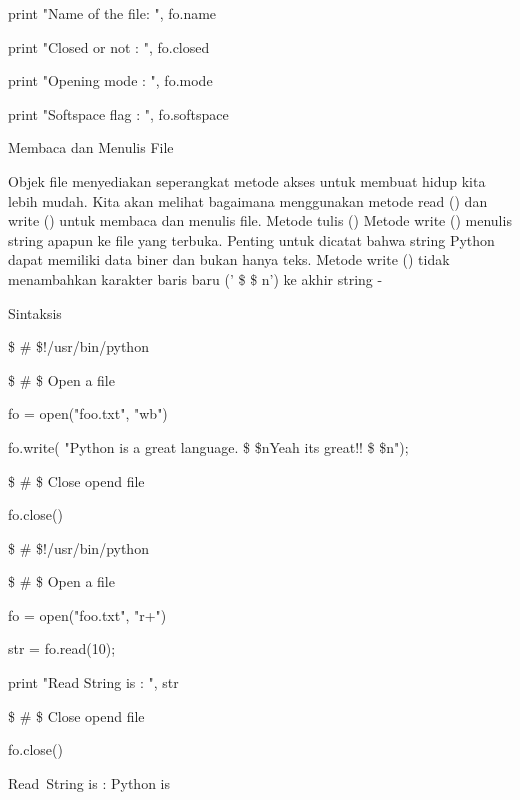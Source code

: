 \noindent 
print "Name of the file: ", fo.name \par
\noindent 
print "Closed or not : ", fo.closed \par
\noindent 
print "Opening mode : ", fo.mode \par
\noindent 
print "Softspace flag : ", fo.softspace \par
\vspace{12pt}
\noindent 
Membaca dan Menulis File \par
\vspace{12pt}
Objek file menyediakan seperangkat metode akses untuk membuat hidup kita lebih mudah. Kita akan melihat bagaimana menggunakan metode read () dan write () untuk membaca dan menulis file. Metode tulis () Metode write () menulis string apapun ke file yang terbuka. Penting untuk dicatat bahwa string Python dapat memiliki data biner dan bukan hanya teks. Metode write () tidak menambahkan karakter baris baru (' \$  \setminus  \$ n') ke akhir string - \par
\noindent 
Sintaksis \par
\vspace{12pt}
\noindent 
 \$  \#  \$!/usr/bin/python \par
\vspace{12pt}
\noindent 
 \$  \#  \$ Open a file \par
\noindent 
fo = open("foo.txt", "wb") \par
\noindent 
fo.write( "Python is a great language. \$  \setminus  \$nYeah its great!! \$  \setminus  \$n"); \par
\vspace{12pt}
\noindent 
 \$  \#  \$ Close opend file \par
\noindent 
fo.close() \par
\noindent 
 \$  \#  \$!/usr/bin/python \par
\vspace{12pt}
\noindent 
 \$  \#  \$ Open a file \par
\noindent 
fo = open("foo.txt", "r+") \par
\noindent 
str = fo.read(10); \par
\noindent 
print "Read String is : ", str \par
\vspace{12pt}
\noindent 
 \$  \#  \$ Close opend file \par
\noindent 
fo.close() \par
\vspace{12pt}
\noindent 
Read~String is :  Python is \par
